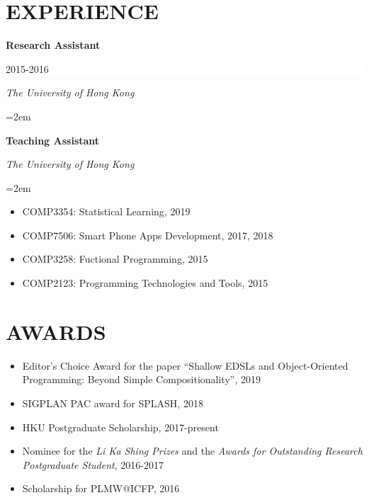 \documentclass[paper=letter,fontsize=11pt]{scrartcl} %
\newcommand{\sepspace}{\vspace*{1em}}		%
\newcommand{\NewPart}[2]{\section*{\uppercase{#1} #2}}
\newcommand{\EducationEntry}[4]{
		\noindent \textbf{#1} \hfill      %
		\colorbox{White}{%
			\parbox{6em}{%
			\hfill\color{Black}#2}} \par  %
		\noindent \textit{#3} \par        %
		\noindent\hangindent=2em\hangafter=0 \small #4 %
		\normalsize \par}
\begin{document}
\NewPart{Experience}{}

\EducationEntry{Research Assistant}{2015-2016}{The University of Hong Kong}{}
\EducationEntry{Teaching Assistant}{}{The University of Hong Kong}
{\begin{itemize}
\item{COMP3354: Statistical Learning, 2019}
\item{COMP7506: Smart Phone Apps Development, 2017, 2018}
\item{COMP3258: Fuctional Programming, 2015}
\item{COMP2123: Programming Technologies and Tools, 2015}
\end{itemize}}
\sepspace

\NewPart{Awards}{}
\begin{itemize}
\item Editor's Choice Award for the paper ``Shallow EDSLs and Object-Oriented
  Programming: Beyond Simple Compositionality'', 2019
\item SIGPLAN PAC award for SPLASH, 2018
\item HKU Postgraduate Scholarship, 2017-present
\item Nominee for the \emph{Li Ka Shing Prizes} and the \emph{Awards for Outstanding Research
  Postgraduate Student}, 2016-2017
\item Scholarship for PLMW@ICFP, 2016
\end{itemize}
\end{document}
